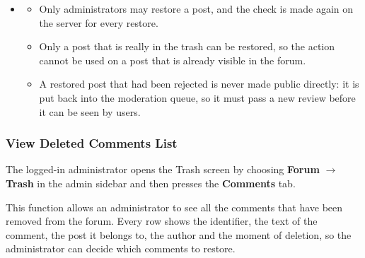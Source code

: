\begin{itemize}[leftmargin=1.6em,topsep=4pt,itemsep=3pt,parsep=0pt,label=$\bullet$]
\begin{itemize}[leftmargin=2.2em,topsep=2pt,itemsep=3pt,parsep=0pt,label=$\circ$]
            \item \textbf{Cannot Restore}: When the post cannot be restored, it stays in the trash and a message asks the administrator to try again.
            \item \textbf{Lost Connection}: When the connection to the server is lost, the restore is not applied and the screen asks the user to try again.
        \end{itemize}
    \item {}
        \begin{itemize}[leftmargin=2.2em,topsep=2pt,itemsep=3pt,parsep=0pt,label=$\circ$]
            \item Only administrators may restore a post, and the check is made again on the server for every restore.
            \item Only a post that is really in the trash can be restored, so the action cannot be used on a post that is already visible in the forum.
            \item A restored post that had been rejected is never made public directly: it is put back into the moderation queue, so it must pass a new review before it can be seen by users.
        \end{itemize}
\end{itemize}


\subsubsection{View Deleted Comments List}

 The logged-in administrator opens the Trash screen by choosing \textbf{Forum} $\rightarrow$ \textbf{Trash} in the admin sidebar and then presses the \textbf{Comments} tab.

 This function allows an administrator to see all the comments that have been removed from the forum. Every row shows the identifier, the text of the comment, the post it belongs to, the author and the moment of deletion, so the administrator can decide which comments to restore.


